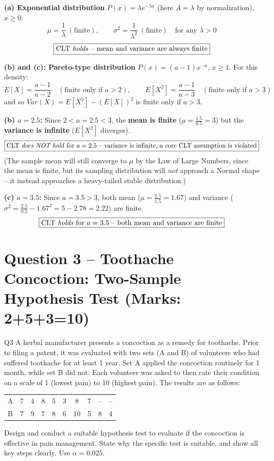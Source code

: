 \documentclass[11pt]{article}
\begin{document}
\textbf{(a) Exponential distribution} $P(x) = \lambda e^{-\lambda x}$ (here $A=\lambda$ by normalization), $x\ge 0$:
\[
\mu = \frac{1}{\lambda}\ (\text{finite}), \qquad \sigma^2 = \frac{1}{\lambda^2}\ (\text{finite}) \quad \text{for any } \lambda>0
\]
\[
\boxed{\text{CLT \emph{holds} -- mean and variance are always finite}}
\]

\textbf{(b) and (c): Pareto-type distribution} $P(x) = (a-1)x^{-a}$, $x\ge 1$. For this density:
\[
E[X] = \frac{a-1}{a-2} \quad (\text{finite only if } a>2), \qquad
E[X^2] = \frac{a-1}{a-3} \quad (\text{finite only if } a>3)
\]
and so $Var(X) = E[X^2]-(E[X])^2$ is finite only if $a>3$.

\textbf{(b) $a=2.5$:} Since $2<a=2.5<3$, the \textbf{mean is finite} ($\mu = \frac{1.5}{0.5}=3$) but the \textbf{variance is infinite} ($E[X^2]$ diverges).
\[
\boxed{\text{CLT \emph{does NOT hold} for } a=2.5 \text{ -- variance is infinite, a core CLT assumption is violated}}
\]
(The sample mean will still converge to $\mu$ by the Law of Large Numbers, since the mean is finite, but its sampling distribution will \emph{not} approach a Normal shape -- it instead approaches a heavy-tailed stable distribution.)

\textbf{(c) $a=3.5$:} Since $a=3.5>3$, both mean ($\mu=\frac{2.5}{1.5}=1.67$) and variance ($\sigma^2 = \frac{2.5}{0.5}-1.67^2 = 5-2.78=2.22$) are finite.
\[
\boxed{\text{CLT \emph{holds} for } a=3.5 \text{ -- both mean and variance are finite}}
\]

\section{Question 3 -- Toothache Concoction: Two-Sample Hypothesis Test (Marks: 2+5+3=10)}
\begin{question}{Q3}
A herbal manufacturer presents a concoction as a remedy for toothache. Prior to filing a patent, it was evaluated with two sets (A and B) of volunteers who had suffered toothache for at least 1 year. Set A applied the concoction routinely for 1 month, while set B did not. Each volunteer was asked to then rate their condition on a scale of 1 (lowest pain) to 10 (highest pain). The results are as follows:

\begin{center}
\begin{tabular}{c|ccccccccc}
\toprule
A & 7 & 4 & 8 & 5 & 3 & 8 & 7 & -- & -- \\
B & 7 & 9 & 7 & 8 & 6 & 10 & 5 & 8 & 4 \\
\bottomrule
\end{tabular}
\end{center}

Design and conduct a suitable hypothesis test to evaluate if the concoction is effective in pain management. State why the specific test is suitable, and show all key steps clearly. Use $\alpha=0.025$.
\end{question}
\end{document}
